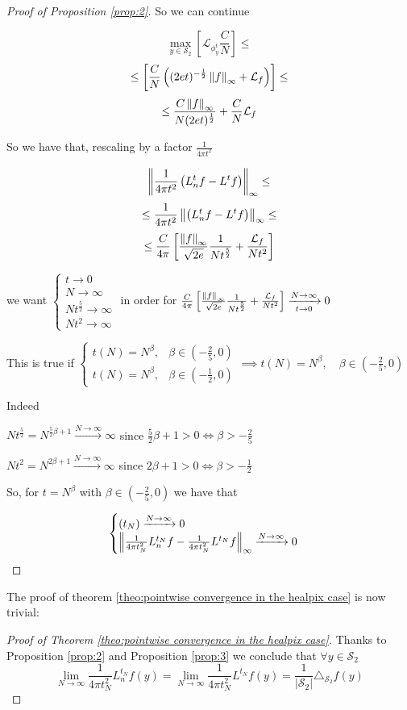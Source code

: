 \begin{proof}[Proof of Proposition \ref{prop:2}]
	So we can continue
	
	$$ \max _{y\in \mathcal S_2} \left[  \mathcal L_{\phi^t_y} \frac{C}{N} \right]\leq$$
	$$ \leq \left[   \frac{C}{N} \left( (2et)^{-\frac{1}{2}} \left\lVert f\right\rVert_\infty + \mathcal L_f \right)\right]\leq$$
	$$  \leq \frac{C\left\lVert f\right\rVert_\infty}{N(2et)^\frac{1}{2}} +   \frac{C}{N}\mathcal L_f$$
	
	So we have that, rescaling by a factor $\frac{1}{4\pi t^2}$
	
	$$\left\lVert\frac{1}{4\pi t^2}\left(L_n^tf-L^tf\right)\right\rVert_\infty\leq$$
	$$\leq \frac{1}{4\pi t^2}\left\lVert\left(L_n^tf-L^tf\right)\right\rVert_\infty \leq$$
	$$ \leq \frac{C}{4\pi}\left[\frac{\left\lVert f\right\rVert_\infty}{\sqrt{2e}}\frac{1}{Nt^\frac{5}{2}} + \frac{\mathcal L_f}{Nt^2}\right]$$
	
	we want $\begin{cases}
	t \rightarrow 0\\
	N \rightarrow \infty\\
	Nt^\frac{5}{2} \rightarrow \infty\\
	Nt^2 \rightarrow \infty
	\end{cases}$ in order for $ \frac{C}{4\pi}\left[\frac{\left\lVert f\right\rVert_\infty}{\sqrt{2e}}\frac{1}{Nt^\frac{5}{2}} + \frac{\mathcal L_f}{Nt^2}\right] \xrightarrow[t\to 0 ]{N\to\infty}0$
	
	This is true if $\begin{cases}
	t(N) = N^\beta, &\beta\in(-\frac{2}{5}, 0) \\
	t(N) = N^\beta, &\beta\in(-\frac{1}{2}, 0)
	\end{cases} \implies t(N) = N^\beta, \quad \beta\in(-\frac{2}{5}, 0)$
	
	Indeed 
	
	$Nt^\frac{5}{2}=N^{\frac{5}{2}\beta+1}\xrightarrow{N \to \infty} \infty$ since $\frac{5}{2}\beta+1>0 \iff \beta>-\frac{2}{5}$
	
	$Nt^2=N^{2\beta+1}\xrightarrow {N \to \infty} \infty$ since $2\beta+1>0 \iff \beta>-\frac{1}{2}$
	
	So, for $t=N^\beta$ with $\beta\in(-\frac{2}{5}, 0)$ we have that 
	
	$$\begin{cases}
	(t_N)\xrightarrow{N\to\infty}0\\
	\left\lVert\frac{1}{4\pi t_N^2}L_n^{t_N}f-\frac{1}{4\pi t_N^2}L^{t_N}f\right\rVert_\infty  \xrightarrow{N\to\infty}0
	\end{cases}$$
	
\end{proof}

The proof of theorem \ref{theo:pointwise convergence in the healpix case} is now trivial:
\begin{proof}[Proof of Theorem \ref{theo:pointwise convergence in the healpix case}]
	Thanks to Proposition \ref{prop:2} and Proposition \ref{prop:3}	we conclude that $\forall y\in\mathcal S_2 $
	$$\lim_{N\to\infty}\frac{1}{4\pi t_N^2} L_n^{t_N}f(y) =  \lim_{N\to\infty}\frac{1}{4\pi t_N^2} L^{t_N}f(y) = \frac{1}{|\mathcal S_2|}\triangle_{\mathcal S_2}f(y) $$
\end{proof}


